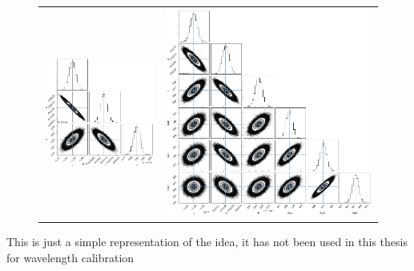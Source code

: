 \begin{figure}
    \centering
    \begin{tabular}{c c}
    \includegraphics[width=0.7\linewidth]{figures/appendix/fixed_quad_corner} & \includegraphics[width=0.7\linewidth]{figures/appendix/variable_quad_corner} \\
    \end{tabular}
    \caption{}
    \label{fig:quadcornerplots}
\end{figure}

This is just a simple representation of the idea, it has not been used in this thesis for wavelength calibration

